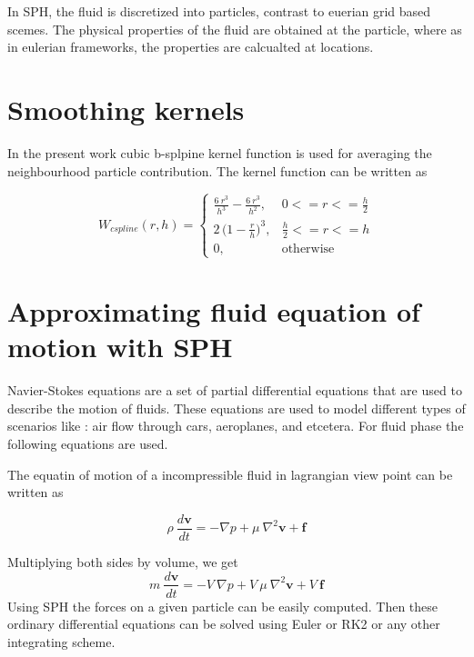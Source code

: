 In SPH, the fluid is discretized into particles, contrast to euerian
grid based scemes. The physical properties of the fluid are obtained
at the particle, where as in eulerian frameworks, the properties are
calcualted at locations.


\section{Smoothing kernels}
\label{sec:sk}


In the present work cubic b-splpine kernel function is used
for averaging the neighbourhood particle contribution. The kernel
function can be written as

\[
    W_{\textit{cspline}}(r, h) =
  \begin{cases}
    \frac{6 \> r^3}{h^3} - \frac{6 \> r^3}{h^2}, & 0 <= r <= \frac{h}{2}\\
    2 \, \big(1 - \frac{r}{h}\big)^3, & \frac{h}{2} <= r <= h\\
    0,                                          & \text{otherwise}
  \end{cases}
\]


\section{Approximating fluid equation of motion with SPH}
\label{sec:fesph}

Navier-Stokes equations are a set of partial differential equations
that are used to describe the motion of fluids. These equations are
used to model different types of scenarios like : air flow through
cars, aeroplanes, and etcetera.  For fluid phase the following
equations are used.

The equatin of motion of a incompressible fluid in lagrangian view
point can be written as

\begin{equation}
  \label{eq:momentum_eq}
  \rho\> \frac{d\textbf{v}}{dt} = -\nabla p + \mu\> \nabla^2\textbf{v} + \textbf{f}
\end{equation}

Multiplying both sides by volume, we get
\begin{equation}
  \label{eq:momentum_eq}
  m\>\frac{d\textbf{v}}{dt} = - V\> \nabla p + V\> \mu\> \nabla^2\textbf{v} + V\> \textbf{f}
\end{equation}
Using SPH the forces on a given particle can be easily computed. Then
these ordinary differential equations can be solved using Euler or RK2
or any other integrating scheme.


